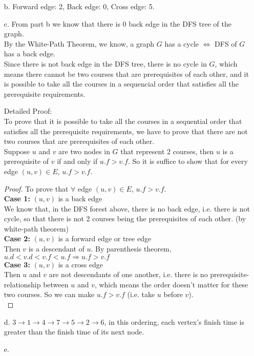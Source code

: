 \documentclass[10pt]{article}
\begin{document}
\begin{itemize}
\item[b.] Forward edge: 2, Back edge: 0, Cross edge: 5.
\item[c.] From part b we know that there is 0 back edge in the DFS tree of the graph.\\
By the White-Path Theorem, we know, a graph $G$ has a cycle $\Leftrightarrow$ DFS of $G$ has a back edge.\\
Since there is not back edge in the DFS tree, there is no cycle in $G$, which means there cannot be two courses that are prerequisites of each other, and it is possible to take all the courses in a sequencial order that satisfies all the prerequisite requirements.

Detailed Proof:\\
To prove that it is possible to take all the courses
in a sequential order that satisfies all the prerequisite requirements, we have to prove that there are not two courses that are prerequisites of each other. \\
Suppose $u$ and $v$ are two nodes in $G$ that represent 2 courses, then $u$ is a prerequisite of $v$ if and only if $u.f>v.f$. So it is suffice to show that for every edge $(u,v)\in E$, $u.f>v.f$.
\begin{proof} To prove that $\forall$ edge $(u,v)\in E$, $u.f>v.f$.\\
\textbf{Case 1:} $(u, v)$ is a back edge\\
We know that, in the DFS forest above, there is no back edge, i.e. there is not cycle, so that there is not 2 courses being the prerequisites of each other. (by white-path theorem)\\
\textbf{Case 2:} $(u,v)$ is a forward edge or tree edge\\
Then $v$ is a descendant of $u$. By parenthesis theorem, $u.d<v.d<v.f<u.f\Rightarrow u.f>v.f$\\
\textbf{Case 3:} $(u,v)$ is a cross edge\\
Then $u$ and $v$ are not descendants of one another, i.e. there is no prerequisite-relationship between $u$ and $v$, which means the order doesn't matter for these two courses. So we can make $u.f>v.f$ (i.e. take $u$ before $v$).\\
\end{proof}
\item[d.] $3\rightarrow 1\rightarrow 4\rightarrow 7\rightarrow 5\rightarrow 2\rightarrow 6$, in this ordering, each vertex's finish time is greater than the finish time of its next node.
\item[e.]
\end{itemize}
\end{document}
